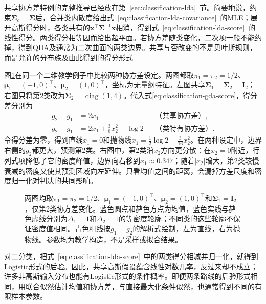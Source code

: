 共享协方差特例的完整推导已经放在第~\ref{sec:classification-lda}~节。简要地说，约束$\bm{\Sigma}_c=\bm{\Sigma}$后，合并类内散度给出式~\eqref{eq:classification-lda-covariance}~的MLE；展开高斯得分时，各类共有的$\bm{x}^{\top}\bm{\Sigma}^{-1}\bm{x}$相消，得到式~\eqref{eq:classification-lda-score}~的线性得分。两类得分相等因而给出超平面。若协方差随类变化，二次项一般不能约掉，得到QDA及通常为二次曲面的两类边界。共享与否改变的不是贝叶斯规则，而是允许的分布族及由此得到的得分形式

图\ref{fig:classification-gaussian-boundaries}在同一个二维教学例子中比较两种协方差设定。两图都取$\pi_1=\pi_2=1/2$、$\bm{\mu}_1=(-1,0)^{\top}$、$\bm{\mu}_2=(1,0)^{\top}$，坐标为无量纲特征。左图共享$\bm{\Sigma}_1=\bm{\Sigma}_2=\bm{I}_2$；右图只将第2类改为$\bm{\Sigma}_2=\operatorname{diag}(1,4)$。代入式\eqref{eq:classification-gda-score}，得分差分别为
\begin{equation}
  \label{eq:classification-gda-boundary-example}
  \begin{aligned}
    g_2-g_1&=2x_1
      &&\text{（共享协方差）},\\
    g_2-g_1&=2x_1+\frac38x_2^2-\log2
      &&\text{（类特有协方差）}.
  \end{aligned}
\end{equation}
令得分差为零，得到直线$x_1=0$和抛物线$x_1=\frac12\log2-\frac{3}{16}x_2^2$。在两种设定中，边界右侧的$g_2$都更大，预测第2类。右图中，第2类沿$x_2$方向更分散：在$x_2=0$附近，行列式项降低了它的密度峰值，边界向右移到$x_1\approx0.347$；随着$|x_2|$增大，第2类较慢衰减的密度又使其预测区域向左延伸。只看均值之间的距离，会漏掉方差尺度和密度归一化对判决的共同影响。
\begin{figure}[htbp]
  \centering
  
  \caption{两图均取$\pi_1=\pi_2=1/2$、$\bm{\mu}_1=(-1,0)^{\top}$、$\bm{\mu}_2=(1,0)^{\top}$和$\bm{\Sigma}_1=\bm{I}_2$，仅第2类协方差变化。蓝色圆点和赭色方点为均值，蓝色实线与赭色虚线分别为$\Delta_1=1$和$\Delta_2=1$的等密度轮廓；不同类的这些轮廓不保证密度值相同。青色粗线按$g_1=g_2$的解析式绘制，左为直线，右为抛物线。参数均为教学构造，不是采样或拟合结果。}
  \label{fig:classification-gaussian-boundaries}
\end{figure}

对二分类，把式~\eqref{eq:classification-lda-score}~中的两类得分相减并归一化，就得到Logistic形式的后验。因此，共享高斯假设蕴含线性对数几率，反过来却不成立；许多非高斯输入分布也能有Logistic形式的条件概率。即便两条路线的后验形式相同，用联合似然估计均值和协方差，与直接最大化条件似然，也通常得到不同的有限样本参数。

